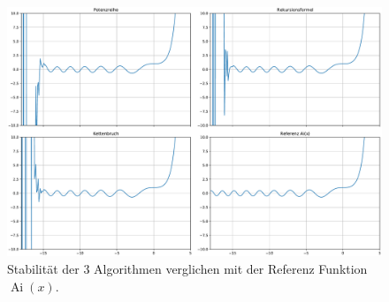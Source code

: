 \begin{figure}
    \centering
    \includegraphics[width=1\textwidth]{papers/0f1/images/stabilitaet.pdf}
    \caption{Stabilität der 3 Algorithmen verglichen mit der Referenz Funktion $\operatorname{Ai}(x)$.
    \label{0f1:ausblick:plot:airy:stabilitaet}}
\end{figure}

